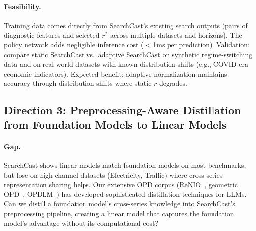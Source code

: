 \documentclass[11pt,a4paper]{article}
\begin{document}
\paragraph{Feasibility.} Training data comes directly from SearchCast's existing search outputs (pairs of diagnostic features and selected $r^*$ across multiple datasets and horizons). The policy network adds negligible inference cost ($<$1ms per prediction). Validation: compare static SearchCast vs.\ adaptive SearchCast on synthetic regime-switching data and on real-world datasets with known distribution shifts (e.g., COVID-era economic indicators). Expected benefit: adaptive normalization maintains accuracy through distribution shifts where static $r$ degrades.

\subsection{Direction 3: Preprocessing-Aware Distillation from Foundation Models to Linear Models}

\paragraph{Gap.} SearchCast shows linear models match foundation models on most benchmarks, but lose on high-channel datasets (Electricity, Traffic) where cross-series representation sharing helps. Our extensive OPD corpus (ReNIO~\cite{lin2026renio}, geometric OPD~\cite{shen2026geometry}, OPDLM~\cite{ye2026opdlm}) has developed sophisticated distillation techniques for LLMs. Can we distill a foundation model's cross-series knowledge into SearchCast's preprocessing pipeline, creating a linear model that captures the foundation model's advantage without its computational cost?
\end{document}
